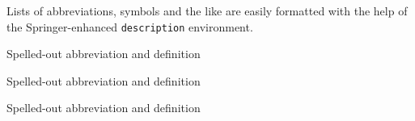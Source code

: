 %
%
%
%
%

%
%


Lists of abbreviations,
symbols and the like are easily formatted with
the help of the Springer-enhanced \verb|description| environment.

\begin{description}[CABR]
\item[ABC]{Spelled-out abbreviation and definition}
\item[BABI]{Spelled-out abbreviation and definition}
\item[CABR]{Spelled-out abbreviation and definition}
\end{description}
